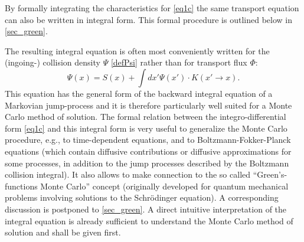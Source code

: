 By formally integrating the characteristics for  \cref{eq1c} the same transport
equation can also be written in integral form.
This formal procedure is outlined below in \cref{sec_green}.

The resulting integral equation is often most conveniently written for the
(ingoing-) collision density $\Psi$ \cref{defPsi} rather than for transport
flux $\Phi$:
\begin{equation}
  \label{eq1d}
  \Psi(x) = S(x) + \int dx ' \Psi (x ') \cdot K(x '\rightarrow x)  . \tag{1.d}
\end{equation}
This equation has the general form of the backward integral equation of a
Markovian jump-process and it is therefore particularly well suited for a Monte
Carlo method of solution.
The formal relation between the integro-differential form \cref{eq1c} and this
integral form is very useful to generalize the Monte Carlo procedure, e.g., to
time-dependent equations, and to Boltzmann-Fokker-Planck equations (which
contain diffusive contributions or diffusive approximations for some processes,
in addition to the jump processes described by the Boltzmann collision
integral).
It also allows to make connection to the so called ``Green's-functions Monte
Carlo'' concept (originally developed for quantum mechanical problems involving
solutions to the Schr\"odinger equation).
A corresponding discussion is postponed to \cref{sec_green}.
A direct intuitive interpretation of the integral equation is already
sufficient to understand the Monte Carlo method of solution and shall be given
first.

